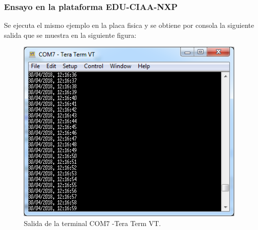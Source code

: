 \subsubsection{Ensayo en la plataforma EDU-CIAA-NXP} 

Se ejecuta el mismo ejemplo en la placa fisica y se obtiene por consola la siguiente salida que se muestra en la siguiente figura:

\begin{figure}[ht]
	\centering
	\includegraphics[scale=.90]{./Figures/rtcprintfPlaca.png}
	\caption{Salida de la terminal COM7 -Tera Term VT.}
	\label{fig:rtcprintfPlaca}
\end{figure}
